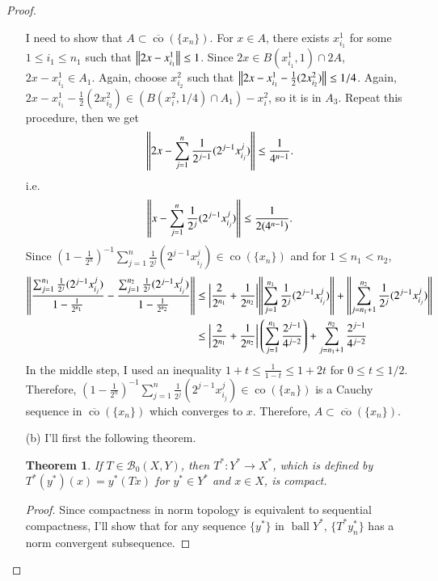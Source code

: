 \documentclass[a4paper, 12pt]{article}
\theoremstyle{Mydefinition}
\theoremstyle{Mytheorem}
\newtheorem{theorem}[statement]{Theorem}
\DeclareMathOperator{\co}{co}
\DeclareMathOperator{\ball}{ball}
\begin{document}
\begin{proof}
\begin{enumerate}
    I need to show that $A\subset \overline{\co}\left(\{x_n\}\right)$. For $x\in A$, there exists $x^1_{i_1}$ for some $1\leq i_1\leq n_1$ such that $\norm{2x-x^1_{i_1}}\leq 1$. Since $2x\in B(x_{i_1}^1, 1)\cap 2A$, $2x-x^1_{i_1} \in A_1$. Again, choose $x^2_{i_2}$ such that $\norm{2x-x^1_{i_1}-\frac{1}{2}(2 x^2_{i_2})}\leq 1/4$. Again, $2x-x_{i_1}^1 - \frac{1}{2}(2x_{i_2}^2)\in (B(x^2_i, 1/4)\cap A_1)-x^2_i$, so it is in $A_3$. Repeat this procedure, then we get
    \begin{equation}
        \norm{2x-\sum_{j=1}^n \frac{1}{2^{j-1}}(2^{j-1} x^j_{i_j})}\leq \frac{1}{4^{n-1}}.
    \end{equation}
    i.e.
    \begin{equation}
        \norm{x-\sum_{j=1}^n \frac{1}{2^{j}}(2^{j-1} x^j_{i_j})}\leq \frac{1}{2(4^{n-1})}.
    \end{equation}
    Since $\left(1-\frac{1}{2^n}\right)^{-1}\sum_{j=1}^n \frac{1}{2^{j}}(2^{j-1} x^j_{i_j})\in \co(\{x_n\})$ and for $1\leq n_1<n_2$,
    \begin{equation}
    \begin{split}
        \norm{\frac{\sum_{j=1}^{n_1}\frac{1}{2^{j}}(2^{j-1} x^j_{i_j})}{1-\frac{1}{2^{n_1}}} - \frac{\sum_{j=1}^{n_2}\frac{1}{2^{j}}(2^{j-1} x^j_{i_j})}{1-\frac{1}{2^{n_2}}}} &\leq \abs{\frac{2}{2^{n_1}} + \frac{1}{2^{n_2}}}\norm{\sum_{j=1}^{n_1} \frac{1}{2^{j}}(2^{j-1} x^j_{i_j})} + \norm{\sum_{j=n_1+1}^{n_2} \frac{1}{2^{j}}(2^{j-1} x^j_{i_j})} \\
        &\leq \abs{\frac{2}{2^{n_1}} + \frac{1}{2^{n_2}}}\left(\sum_{j=1}^{n_1} \frac{2^{j-1}}{4^{j-2}}\right) + \sum_{j=n_1+1}^{n_2} \frac{2^{j-1}}{4^{j-2}}
    \end{split}
    \end{equation}
    In the middle step, I used an inequality $1+t\leq \frac{1}{1-t}\leq 1+2t$ for $0\leq t\leq 1/2$. Therefore, $\left(1-\frac{1}{2^n}\right)^{-1}\sum_{j=1}^n \frac{1}{2^{j}}(2^{j-1} x^j_{i_j})\in \co(\{x_n\})$ is a Cauchy sequence in $\overline{\co}(\{x_n\})$ which converges to $x$. Therefore, $A\subset \overline{\co}(\{x_n\})$.
    
    \item[(b)]
    I'll first the following theorem.
    \begin{theorem}
        If $T\in \mathcal{B}_0(X,Y)$, then $T^*:Y^*\rightarrow X^*$, which is defined by $T^*(y^*)(x) = y^*(Tx)$ for $y^*\in Y^*$ and $x\in X$, is compact.
    \end{theorem}
    \begin{proof}
        Since compactness in norm topology is equivalent to sequential compactness, I'll show that for any sequence $\{y^*\}$ in $\ball Y^*$, $\{T^* y_n^*\}$ has a norm convergent subsequence.
        

\end{proof}
\end{enumerate}
\end{proof}
\end{document}

